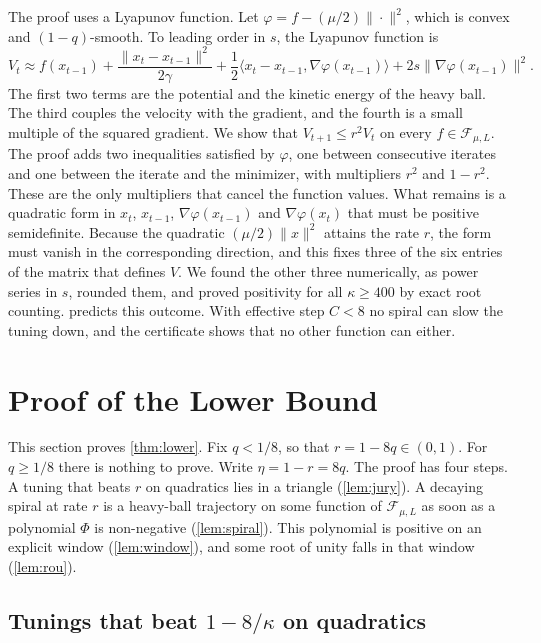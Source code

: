 \documentclass[11pt, a4paper]{article}
\theoremstyle{definition}
\newcommand{\F}{\mathcal{F}_{\mu,L}}
\begin{document}
The proof uses a Lyapunov function. Let $\varphi=f-(\mu/2)\|\cdot\|^2$, which is convex and $(1-q)$-smooth. To
leading order in $s$, the Lyapunov function is
\[
  V_t\approx f(x_{t-1})+\frac{\|x_t-x_{t-1}\|^2}{2\gamma}+\frac12\langle x_t-x_{t-1},\nabla\varphi(x_{t-1})\rangle
  +2s\|\nabla\varphi(x_{t-1})\|^2.
\]
The first two terms are the potential and the kinetic energy of the heavy ball. The third couples the velocity with
the gradient, and the fourth is a small multiple of the squared gradient. We show that $V_{t+1}\le r^2V_t$ on every $f\in\F$. The proof adds two inequalities satisfied by
$\varphi$, one between consecutive iterates and one between the iterate and the minimizer, with multipliers $r^2$ and
$1-r^2$. These are the only multipliers that cancel the function values. What remains is a quadratic form in
$x_t$, $x_{t-1}$, $\nabla\varphi(x_{t-1})$ and $\nabla\varphi(x_t)$ that must be positive semidefinite. Because the
quadratic $(\mu/2)\|x\|^2$ attains the rate $r$, the form must vanish in the corresponding direction, and this fixes
three of the six entries of the matrix that defines $V$. We found the other three numerically, as power series in $s$,
rounded them, and proved positivity for all $\kappa\ge400$ by exact root counting.  predicts this
outcome. With effective step $C<8$ no spiral can slow the tuning down, and the certificate shows that no other function
can either.

\section{Proof of the Lower Bound}
\label{sec:lower}

This section proves \cref{thm:lower}. Fix $q<1/8$, so that $r=1-8q\in(0,1)$. For $q\ge1/8$ there is nothing to prove.
Write $\eta=1-r=8q$. The proof has four steps. A tuning that beats $r$ on quadratics lies in a triangle
(\cref{lem:jury}). A decaying spiral at rate $r$ is a heavy-ball trajectory on some function of $\F$ as soon as a
polynomial $\Phi$ is non-negative (\cref{lem:spiral}). This polynomial is positive on an explicit window
(\cref{lem:window}), and some root of unity falls in that window (\cref{lem:rou}).

\subsection{Tunings that beat \texorpdfstring{$1-8/\kappa$}{1-8/kappa} on quadratics}
\end{document}
